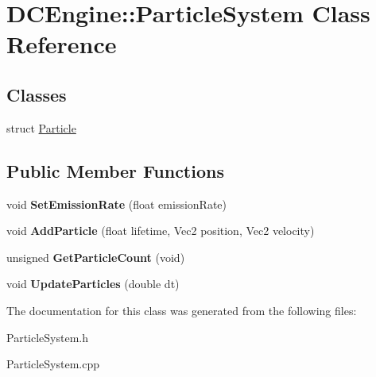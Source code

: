 \hypertarget{classDCEngine_1_1ParticleSystem}{\section{D\-C\-Engine\-:\-:Particle\-System Class Reference}
\label{classDCEngine_1_1ParticleSystem}
}
\subsection*{Classes}
\begin{DoxyCompactItemize}
\item 
struct \hyperlink{structDCEngine_1_1ParticleSystem_1_1Particle}{Particle}
\end{DoxyCompactItemize}
\subsection*{Public Member Functions}
\begin{DoxyCompactItemize}
\item 
\hypertarget{classDCEngine_1_1ParticleSystem_a9b87ec4a76209935b8333ef9c5cd7b21}{void {\bfseries Set\-Emission\-Rate} (float emission\-Rate)}\label{classDCEngine_1_1ParticleSystem_a9b87ec4a76209935b8333ef9c5cd7b21}

\item 
\hypertarget{classDCEngine_1_1ParticleSystem_accb98506d783323791e91483d9610863}{void {\bfseries Add\-Particle} (float lifetime, Vec2 position, Vec2 velocity)}\label{classDCEngine_1_1ParticleSystem_accb98506d783323791e91483d9610863}

\item 
\hypertarget{classDCEngine_1_1ParticleSystem_a1db98ada84df48fbd98aa79d1fd073ae}{unsigned {\bfseries Get\-Particle\-Count} (void)}\label{classDCEngine_1_1ParticleSystem_a1db98ada84df48fbd98aa79d1fd073ae}

\item 
\hypertarget{classDCEngine_1_1ParticleSystem_a2ed3b3d177ce3c5b4cda762dd9f8e42f}{void {\bfseries Update\-Particles} (double dt)}\label{classDCEngine_1_1ParticleSystem_a2ed3b3d177ce3c5b4cda762dd9f8e42f}

\end{DoxyCompactItemize}


The documentation for this class was generated from the following files\-:\begin{DoxyCompactItemize}
\item 
Particle\-System.\-h\item 
Particle\-System.\-cpp\end{DoxyCompactItemize}
